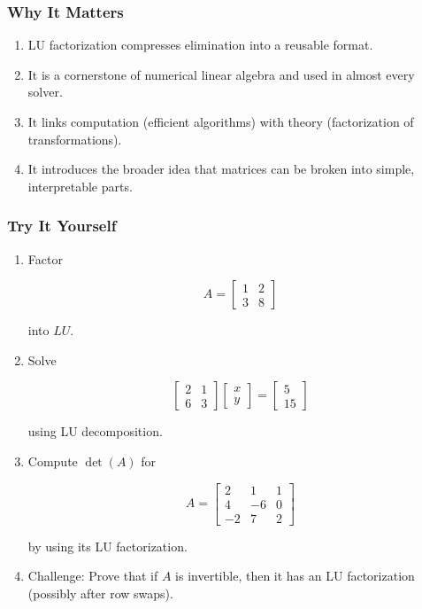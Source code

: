 \documentclass[
  letterpaper,
  DIV=11,
  numbers=noendperiod]{scrreprt}
\providecommand{\tightlist}{%
  \setlength{\itemsep}{0pt}\setlength{\parskip}{0pt}}
\begin{document}
\subsubsection{Why It Matters}\label{why-it-matters-26}

\begin{enumerate}
\def\labelenumi{\arabic{enumi}.}
\tightlist
\item
  LU factorization compresses elimination into a reusable format.
\item
  It is a cornerstone of numerical linear algebra and used in almost
  every solver.
\item
  It links computation (efficient algorithms) with theory (factorization
  of transformations).
\item
  It introduces the broader idea that matrices can be broken into
  simple, interpretable parts.
\end{enumerate}

\subsubsection{Try It Yourself}\label{try-it-yourself-29}

\begin{enumerate}
\def\labelenumi{\arabic{enumi}.}
\item
  Factor

  \[
  A = \begin{bmatrix}  
  1 & 2 \\  
  3 & 8  
  \end{bmatrix}
  \]

  into \(LU\).
\item
  Solve

  \[
  \begin{bmatrix}  
  2 & 1 \\  
  6 & 3  
  \end{bmatrix}  
  \begin{bmatrix}  
  x \\ y  
  \end{bmatrix} =  
  \begin{bmatrix}  
  5 \\ 15  
  \end{bmatrix}
  \]

  using LU decomposition.
\item
  Compute \(\det(A)\) for

  \[
  A = \begin{bmatrix}  
  2 & 1 & 1 \\  
  4 & -6 & 0 \\  
  -2 & 7 & 2  
  \end{bmatrix}
  \]

  by using its LU factorization.
\item
  Challenge: Prove that if \(A\) is invertible, then it has an LU
  factorization (possibly after row swaps).
\end{enumerate}
\end{document}
